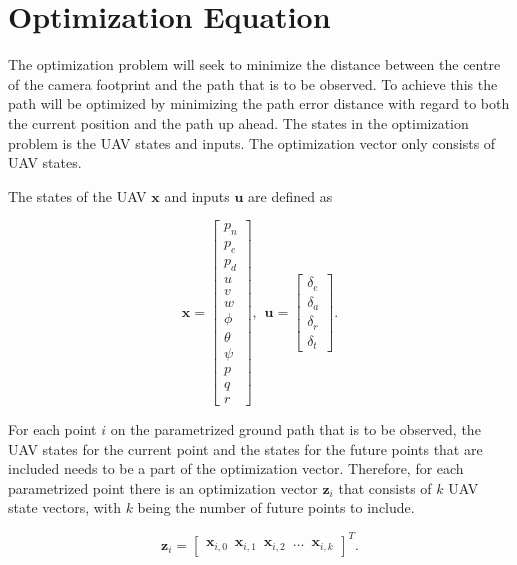 \section*{Optimization Equation}

The optimization problem will seek to minimize the distance between the centre of the camera footprint and the path that is to be observed. To achieve this the path will be optimized by minimizing the path error distance with regard to both the current position and the path up ahead. The states in the optimization problem is the UAV states and inputs. The optimization vector only consists of UAV states.

The states of the UAV $\mathbf{x}$ and inputs $\mathbf{u}$ are defined as

\begin{equation}
	\mathbf{x} = 
	\begin{bmatrix}
		p_n 	\\ p_e		\\ p_d	\\
		u 		\\ v   		\\ w 	\\ 
		\phi	\\ \theta	\\ \psi	\\
		p		\\ q		\\ r
	\end{bmatrix}, \hspace{5pt}
	\mathbf{u} = 
	\begin{bmatrix}
		\delta_e\\ \delta_a	\\ \delta_r	\\ \delta_t
	\end{bmatrix}.
\end{equation}

For each point $i$ on the parametrized ground path that is to be observed, the UAV states for the current point and the states for the future points that are included needs to be a part of the optimization vector. Therefore, for each parametrized point there is an optimization vector $\mathbf{z}_i$ that consists of $k$ UAV state vectors, with $k$ being the number of future points to include.

\begin{equation}
	\mathbf{z}_i =
	\begin{bmatrix}
		\mathbf{x}_{i,0} \hspace{6pt} \mathbf{x}_{i,1} \hspace{6pt} \mathbf{x}_{i,2} \hspace{6pt} \hdots \hspace{6pt} \mathbf{x}_{i,k}
	\end{bmatrix}^T.
\end{equation}

